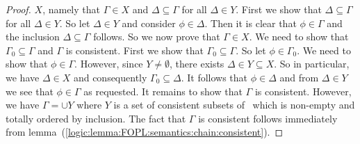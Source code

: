 \begin{proof}
$X$, namely that $\Gamma\in X$ and $\Delta\subseteq\Gamma$ for all
$\Delta\in Y$. First we show that $\Delta\subseteq\Gamma$ for all
$\Delta\in Y$. So let $\Delta\in Y$ and consider $\phi\in\Delta$.
Then it is clear that $\phi\in\Gamma$ and the inclusion
$\Delta\subseteq\Gamma$ follows. So we now prove that $\Gamma\in X$.
We need to show that $\Gamma_{0}\subseteq\Gamma$ and $\Gamma$ is
consistent. First we show that $\Gamma_{0}\subseteq\Gamma$. So let
$\phi\in\Gamma_{0}$. We need to show that $\phi\in\Gamma$. However,
since $Y\neq\emptyset$, there exists $\Delta\in Y\subseteq X$. So in
particular, we have $\Delta\in X$ and consequently
$\Gamma_{0}\subseteq\Delta$. It follows that $\phi\in\Delta$ and
from $\Delta\in Y$ we see that $\phi\in\Gamma$ as requested. It
remains to show that $\Gamma$ is consistent. However, we have
$\Gamma=\cup Y$ where $Y$ is a set of consistent subsets of \pv\
which is non-empty and totally ordered by inclusion. The fact that
$\Gamma$ is consistent follows immediately from
lemma~(\ref{logic:lemma:FOPL:semantics:chain:consistent}).
\end{proof}
